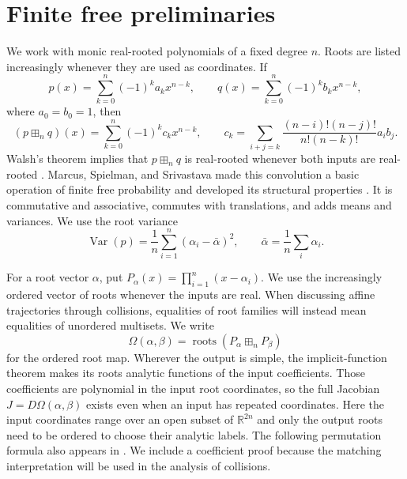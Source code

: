 \documentclass[12pt,reqno]{amsart}
\theoremstyle{definition}
\theoremstyle{remark}
\newcommand{\R}{\mathbb R}
\newcommand{\Var}{\operatorname{Var}}
\begin{document}


\section{Finite free preliminaries}\label{sec:preliminaries}

We work with monic real-rooted polynomials of a fixed degree \(n\).
Roots are listed increasingly whenever they are used as coordinates.  If
\begin{equation}\label{eq:coefficients}
 p(x)=\sum_{k=0}^n(-1)^ka_kx^{n-k},\qquad
 q(x)=\sum_{k=0}^n(-1)^kb_kx^{n-k},
\end{equation}
where \(a_0=b_0=1\), then
\begin{equation}\label{eq:convolution-coefficients}
 (p\boxplus_nq)(x)=\sum_{k=0}^n(-1)^kc_kx^{n-k},
 \qquad
 c_k=\sum_{i+j=k}
 \frac{(n-i)!(n-j)!}{n!(n-k)!}a_ib_j.
\end{equation}
Walsh's theorem implies that \(p\boxplus_nq\) is real-rooted whenever both
inputs are real-rooted \cite{Walsh22}.  Marcus, Spielman, and Srivastava made
this convolution a basic operation of finite free probability and developed
its structural properties \cite{MSS22}.  It is commutative and associative,
commutes with translations, and adds means and variances.  We use the root variance
\begin{equation}\label{eq:variance}
 \Var(p)=\frac1n\sum_{i=1}^n(\alpha_i-\bar\alpha)^2,
 \qquad \bar\alpha=\frac1n\sum_i\alpha_i.
\end{equation}

For a root vector \(\alpha\), put
\(P_\alpha(x)=\prod_{i=1}^n(x-\alpha_i)\).  We use the increasingly ordered vector of roots whenever the inputs are real.
When discussing affine trajectories through collisions, equalities of root
families will instead mean equalities of unordered multisets.  We write
\begin{equation}\label{eq:root-map}
 \Omega(\alpha,\beta)=\operatorname{roots}(P_\alpha\boxplus_nP_\beta)
\end{equation}
for the ordered root map.  Wherever the output is simple, the
implicit-function theorem makes its roots analytic functions of the
input coefficients.  Those coefficients are polynomial in the input
root coordinates, so the full Jacobian \(J=D\Omega(\alpha,\beta)\)
exists even when an input has repeated coordinates.  Here the input
coordinates range over an open subset of \(\R^{2n}\) and only the output
roots need to be ordered to choose their analytic labels. The following permutation formula also appears in \cite[Theorem~1.1, equation~(5)]{GorinMarcus20}. We include a coefficient proof because the matching interpretation will be used in the analysis of collisions.
\end{document}
